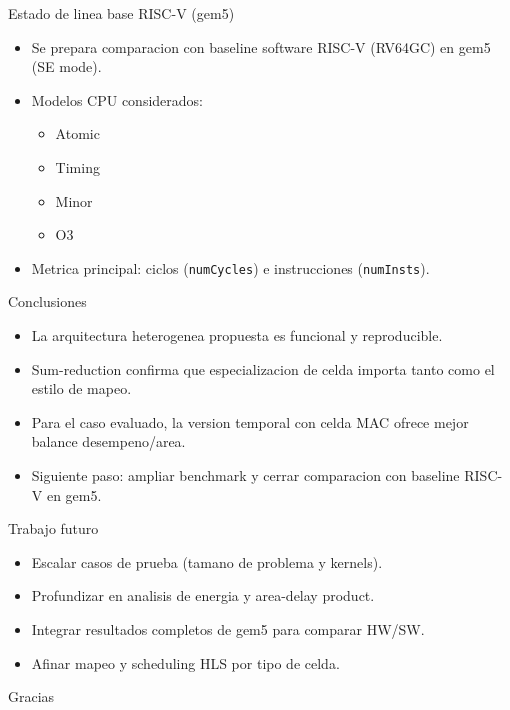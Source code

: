 \documentclass[aspectratio=169]{beamer}
\begin{document}
\begin{frame}{Estado de linea base RISC-V (gem5)}
\begin{itemize}
  \item Se prepara comparacion con baseline software RISC-V (RV64GC) en gem5 (SE mode).
  \item Modelos CPU considerados:
  \begin{itemize}
    \item Atomic
    \item Timing
    \item Minor
    \item O3
  \end{itemize}
  \item Metrica principal: ciclos (\texttt{numCycles}) e instrucciones (\texttt{numInsts}).
\end{itemize}
\end{frame}

\begin{frame}{Conclusiones}
\begin{itemize}
  \item La arquitectura heterogenea propuesta es funcional y reproducible.
  \item Sum-reduction confirma que especializacion de celda importa tanto como el estilo de mapeo.
  \item Para el caso evaluado, la version temporal con celda MAC ofrece mejor balance desempeno/area.
  \item Siguiente paso: ampliar benchmark y cerrar comparacion con baseline RISC-V en gem5.
\end{itemize}
\end{frame}

\begin{frame}{Trabajo futuro}
\begin{itemize}
  \item Escalar casos de prueba (tamano de problema y kernels).
  \item Profundizar en analisis de energia y area-delay product.
  \item Integrar resultados completos de gem5 para comparar HW/SW.
  \item Afinar mapeo y scheduling HLS por tipo de celda.
\end{itemize}
\end{frame}

\begin{frame}
\centering
\Huge Gracias
\end{frame}
\end{document}
